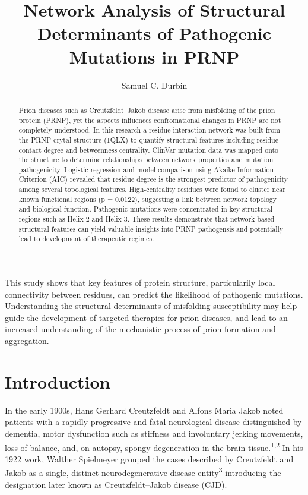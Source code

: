\documentclass[
  twocolumn]{biophys-new-mod}
\title{Network Analysis of Structural Determinants of Pathogenic
Mutations in PRNP}
\author[1,*]
  {Samuel C. Durbin}
\affil[1]{California State University, Los Angeles, Department of
Biological Sciences}
\begin{document}
\begin{frontmatter}

\begin{abstract}
Prion diseases such as Creutzfeldt--Jakob disease arise from misfolding
of the prion protein (PRNP), yet the aspects influences confromational
changes in PRNP are not completely understood. In this research a
residue interaction network was built from the PRNP crytal structure
(1QLX) to quantify structural features including residue contact degree
and betweenness centrality. ClinVar mutation data was mapped onto the
structure to determine relationships between network properties and
mutation pathogenicity. Logistic regression and model comparison using
Akaike Information Criterion (AIC) revealed that residue degree is the
strongest predictor of pathogenicity among several topological features.
High-centrality residues were found to cluster near known functional
regions (p = 0.0122), suggesting a link between network topology and
biological function. Pathogenic mutations were concentrated in key
structural regions such as Helix 2 and Helix 3. These results
demonstrate that network based structural features can yield valuable
insights into PRNP pathogensis and potentially lead to development of
therapeutic regimes.
\end{abstract}


\begin{sigstatement}
This study shows that key features of protein structure, particularily
local connectivity between residues, can predict the likelihood of
pathogenic mutations. Understanding the structural determinants of
misfolding susceptibility may help guide the development of targeted
therapies for prion diseases, and lead to an increased understanding of
the mechanistic process of prion formation and aggregation.
\end{sigstatement}


\end{frontmatter}

\section{Introduction}\label{introduction}

In the early 1900s, Hans Gerhard Creutzfeldt and Alfons Maria Jakob
noted patients with a rapidly progressive and fatal neurological disease
distinguished by dementia, motor dysfunction such as stiffness and
involuntary jerking movements, loss of balance, and, on autopsy, spongy
degeneration in the brain tissue.\textsuperscript{1,2} In his 1922 work,
Walther Spielmeyer grouped the cases described by Creutzfeldt and Jakob
as a single, distinct neurodegenerative disease
entity\textsuperscript{3} introducing the designation later known as
Creutzfeldt--Jakob disease (CJD).
\end{document}
